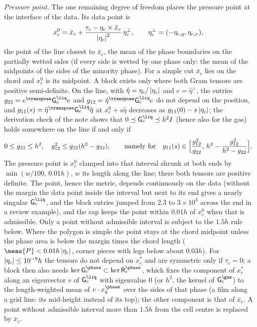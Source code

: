 \emph{Pressure point.} The one remaining degree of freedom places the pressure
point at the interface of the data. Its data point is
\begin{equation}\label{eq:projection:mimetic-point}
  x^{0}_c=\bar x_c+\frac{\tau_c-\eta_c\times\bar x_c}{\left\lvert \eta_c \right\rvert^2}\,\eta_c^{\perp},\qquad
  \eta_c^{\perp}=(-\eta_{c,y},\eta_{c,x}),
\end{equation}
the point of the line closest to $\bar x_c$, the mean of the phase boundaries
on the partially wetted sides (if every side is wetted by one phase only: the
mean of the midpoints of the sides of the minority phase). For a simple cut
$\bar x_c$ lies on the chord and $x^{0}_c$ is its midpoint. A block exists
only where both Gram tensors are positive semi-definite. On the line, with
$\hat\eta=\eta_c/\left\lvert \eta_c \right\rvert$ and $e=\hat\eta^{\perp}$, the entries
$g_{22}=e^{\transpose}\mathsf G^{\liq}_ce$ and $g_{12}=\hat\eta^{\transpose}\mathsf G^{\liq}_ce$
do not depend on the position, and
$g_{11}(s)=\hat\eta^{\transpose}\mathsf G^{\liq}_c\hat\eta$ at $x^{0}_c+s\hat\eta$
decreases as $g_{11}(0)-s\left\lvert \eta_c \right\rvert$; the derivation check of the note shows
that $0\preceq\mathsf G^{\liq}_c\preceq h^2I$ (hence also for the gas) holds
somewhere on the line if and only if
\begin{equation}\label{eq:projection:mimetic-interval}
  0\le g_{22}\le h^2,\quad g_{12}^2\le g_{22}(h^2-g_{22}),\qquad\text{namely for}\quad
  g_{11}(s)\in\Bigl[\frac{g_{12}^2}{g_{22}},\,h^2-\frac{g_{12}^2}{h^2-g_{22}}\Bigr].
\end{equation}
The pressure point is $x^{0}_c$ clamped into that interval shrunk at both ends
by $\min(w/100,\,0.01h)$, $w$ its length along the line; there both tensors
are positive definite. The point, hence the metric, depends continuously on
the data (without the margin the data point inside the interval but next to
its end gives a nearly singular $\mathsf G^{\liq}_c$, and the block entries
jumped from $2.3$ to $3\times10^3$ across the end in a review example), and
the cap keeps the point within $0.01h$ of $x^{0}_c$ when that is admissible.
Only a point without admissible interval is subject to the $1.5h$ rule
below. Where the polygon is simple the point stays at the chord midpoint
unless the phase area is below the margin times the chord length
($\meas{P}<0.01h\abs{\eta_c}$, corner pieces with legs below about $0.03h$).
For
$\left\lvert \eta_c \right\rvert\le10^{-9}h$ the tensors do not depend on $x^{*}_c$ and are
symmetric only if $\tau_c=0$; a block then also needs
$\ker\mathsf G^{\phase}_c\subset\ker\mathsf R^{\phase}_c$, which
fixes the component of $x^{*}_c$ along an eigenvector $v$ of
$\mathsf G^{\liq}_c$ with eigenvalue $0$ (or $h^2$, the kernel of
$\mathsf G^{\gas}_c$) to the length-weighted mean of $v\cdot x^{\phase}_k$ over the
sides of that phase (a film along a grid line: its mid-height instead of its
top); the other component is that of $\bar x_c$. A point without admissible
interval more than $1.5h$ from the cell centre is replaced by $\bar x_c$.

